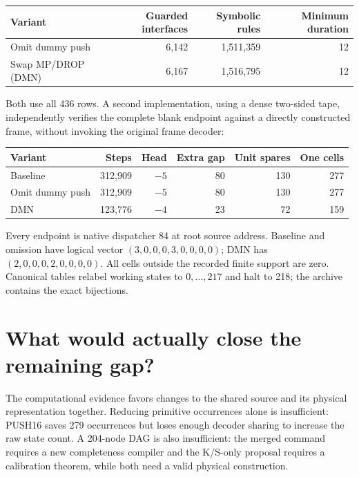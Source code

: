 \documentclass[11pt]{article}
\begin{document}
\begin{center}
\begin{tabular}{lrrr}
\toprule
Variant & Guarded interfaces & Symbolic rules & Minimum duration\\
\midrule
Omit dummy push &6,142&1,511,359&12\\
Swap MP/DROP (DMN) &6,167&1,516,795&12\\
\bottomrule
\end{tabular}
\end{center}
Both use all 436 rows. A second implementation, using a dense two-sided tape,
independently verifies the complete blank endpoint against a directly
constructed frame, without invoking the original frame decoder:
\begin{center}
\begin{tabular}{lrrrrr}
\toprule
Variant & Steps & Head & Extra gap & Unit spares & One cells\\
\midrule
Baseline &312,909&$-5$&80&130&277\\
Omit dummy push &312,909&$-5$&80&130&277\\
DMN &123,776&$-4$&23&72&159\\
\bottomrule
\end{tabular}
\end{center}
Every endpoint is native dispatcher 84 at root source address. Baseline and
omission have logical vector $(3,0,0,0,3,0,0,0,0)$; DMN has
$(2,0,0,0,2,0,0,0,0)$. All cells outside the recorded finite support are zero.
Canonical tables relabel working states to $0,\ldots,217$ and halt to 218;
the archive contains the exact bijections.





\section{What would actually close the remaining gap?}
The computational evidence favors changes to the shared source and its physical
representation together. Reducing primitive occurrences alone is insufficient:
PUSH16 saves 279 occurrences but loses enough decoder sharing to increase the
raw state count. A 204-node DAG is also insufficient: the merged command
requires a new completeness compiler and the K/S-only proposal requires a
calibration theorem, while both need a valid physical construction.
\end{document}
